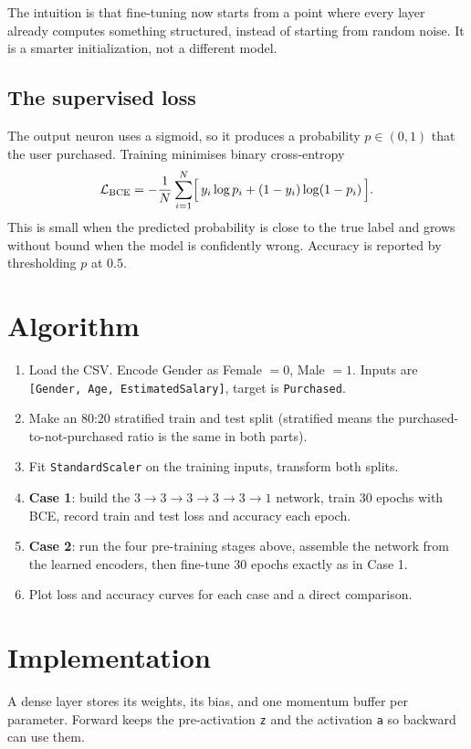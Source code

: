 \documentclass[12pt]{article}
\begin{document}
The intuition is that fine-tuning now starts from a point where every layer
already computes something structured, instead of starting from random noise.
It is a smarter initialization, not a different model.

\subsection{The supervised loss}

The output neuron uses a sigmoid, so it produces a probability
$p \in (0,1)$ that the user purchased. Training minimises binary cross-entropy
\[
  \mathcal{L}_{\text{BCE}} = -\frac{1}{N}\sum_{i=1}^{N}
  \Bigl[\, y_i \log p_i + (1-y_i)\log(1-p_i) \,\Bigr] .
\]
This is small when the predicted probability is close to the true label and
grows without bound when the model is confidently wrong. Accuracy is reported
by thresholding $p$ at $0.5$.

\section{Algorithm}

\begin{enumerate}
\item Load the CSV. Encode Gender as Female $=0$, Male $=1$. Inputs are
      \texttt{[Gender, Age, EstimatedSalary]}, target is \texttt{Purchased}.
\item Make an 80:20 stratified train and test split (stratified means the
      purchased-to-not-purchased ratio is the same in both parts).
\item Fit \texttt{StandardScaler} on the training inputs, transform both splits.
\item \textbf{Case 1}: build the $3\to3\to3\to3\to3\to1$ network, train 30
      epochs with BCE, record train and test loss and accuracy each epoch.
\item \textbf{Case 2}: run the four pre-training stages above, assemble the
      network from the learned encoders, then fine-tune 30 epochs exactly as in
      Case 1.
\item Plot loss and accuracy curves for each case and a direct comparison.
\end{enumerate}

\section{Implementation}

A dense layer stores its weights, its bias, and one momentum buffer per
parameter. Forward keeps the pre-activation \texttt{z} and the activation
\texttt{a} so backward can use them.
\end{document}
